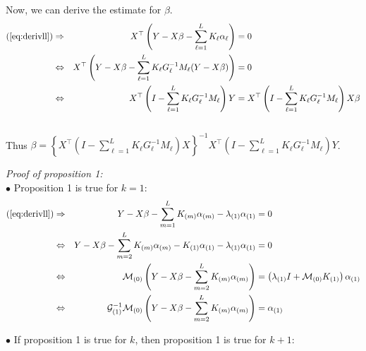 \begin{changebar}[0.2cm]
\noindent Now, we can derive the estimate for $\beta$.\\

\begin{align*}
(\ref{eq:derivll}) \Rightarrow && X^\top \left( Y - X\beta - \sum\limits_{\ell = 1}^L K_{\ell}\alpha_{\ell} \right) & = 0 \\
\Leftrightarrow && X^\top\left( Y - X\beta - \sum\limits_{\ell = 1}^L K_{\ell}G_{\ell}^ {-1}M_{\ell} (Y - X\beta)\right) & = 0 \\
\Leftrightarrow && X^\top\left( I - \sum\limits_{\ell = 1}^L K_{\ell}G_{\ell}^ {-1}M_{\ell} \right) Y & = X^\top\left( I - \sum\limits_{\ell = 1}^L K_{\ell}G_{\ell}^ {-1}M_{\ell} \right) X\beta \\
\end{align*}
~\\

\noindent Thus $\beta = \left\lbrace X^\top\left( I - \sum\limits_{\ell = 1}^L K_{\ell}G_{\ell}^ {-1}M_{\ell} \right) X \right\rbrace^{-1} X^\top\left( I - \sum\limits_{\ell = 1}^L K_{\ell}G_{\ell}^ {-1}M_{\ell} \right) Y$. \\ \vspace{0.3cm}

\noindent \textit{Proof of proposition 1:} \\

$\bullet$ Proposition 1 is true for $k = 1$: \\


\begin{align*}
\text{(\ref{eq:derivll})} \Rightarrow             && Y - X\beta - \sum\limits_{m = 1}^L K_{(m)} \alpha_{(m)} - \lambda_{(1)} \alpha_{(1)} & = 0 \\
\Leftrightarrow && Y - X\beta - \sum\limits_{m = 2}^L K_{(m)} \alpha_{(m)} - K_{(1)} \alpha_{(1)} - \lambda_{(1)} \alpha_{(1)}  & =  0 \\
\Leftrightarrow && \mathcal{M}_{(0)} \left( Y - X\beta - \sum\limits_{m = 2}^L K_{(m)} \alpha_{(m)} \right) & =  \left( \lambda_{(1)} I + \mathcal{M}_{(0)} K_{(1)} \right) \alpha_{(1)} \\
\Leftrightarrow && \mathcal{G}_{(1)}^{-1} \mathcal{M}_{(0)} \left( Y - X\beta - \sum\limits_{m = 2}^L K_{(m)} \alpha_{(m)} \right) & =  \alpha_{(1)} \\
\end{align*}

$\bullet$ If proposition 1 is true for $k$, then proposition 1 is true for $k + 1$: \\



\end{changebar}
